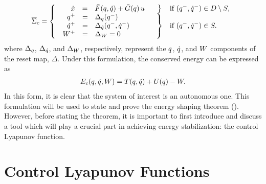 \begin{align}
  \HCSbar = \left\{
    \begin{array}{l c l}
      \begin{array}{r c l}
        \hspace{1.15em}\dx &=& \xfbar\argsqdq + \xgbar\argsq \, \uu
      \end{array} &
      \left.\vphantom{\begin{array}{r c l}
            \hspace{1.15em}\dx &=& \xfbar\argsqdq + \xgbar\argsq \, \uu
          \end{array}}\right\} & \mbox{if } \argsqmdqm \in \D \setminus \Guard,\\
      \begin{array}{r c l}
          \qp &=& \Deltaq\argsqm\\
          \dqp &=& \Deltadq\argsqmdqm\\
          \Wp &=& \DeltaW = 0
        \end{array} &
        \left.\vphantom{\begin{array}{r c l}
          \qp &=& \Deltaq\argsqm\\
          \dqp &=& \Deltadq\argsqmdqm\\
          \Wp &=& \DeltaW = 0
        \end{array}}\right\} & \mbox{if } \argsqmdqm \in \Guard.
    \end{array}\right.
  \label{eq:hcs_bar}
\end{align}
where $\Delta_{q}$, $\Delta_{\dot{q}}$, and $\Delta_{W}$, respectively, represent the $q$,
$\dot{q}$, and $W$ components of the reset map, $\Delta$.
%
Under this formulation, the conserved energy can be expressed as
\begin{align*}
  E_{c}(q, \dot{q}, W) = T(q, \dot{q}) + U(q) - W.
\end{align*}
%
In this form, it is clear that the system of interest is an autonomous one.
%
This formulation will be used to state and prove the energy shaping theorem (). 
%
However, before stating the theorem, it is important to first introduce and
discuss a tool which will play a crucial part in achieving energy stabilization:
the control Lyapunov function.

\section{Control Lyapunov Functions}

